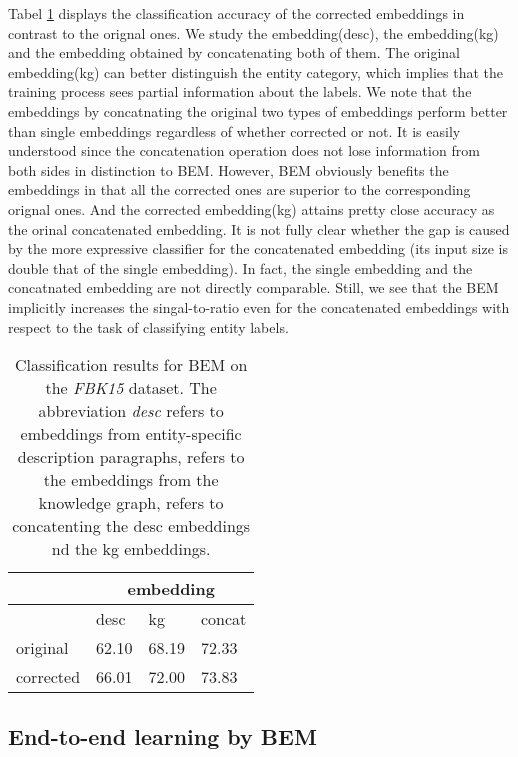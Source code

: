 Tabel \ref{tbl:entity_class_fbk15} displays the classification accuracy of the corrected embeddings in contrast to the orignal ones. We study the embedding(desc), the embedding(kg) and the embedding obtained by concatenating both of them. The original embedding(kg) can better distinguish the entity category, which implies that the training process sees partial information about the labels. We note that the embeddings by concatnating the original two types of embeddings perform better than single embeddings regardless of whether corrected or not. It is easily understood since the concatenation operation does not lose information from both sides in distinction to BEM. However, BEM obviously benefits the embeddings in that all the corrected ones are superior to the corresponding orignal ones. And the corrected embedding(kg) attains pretty close accuracy as the orinal concatenated embedding. It is not fully clear whether the gap is caused by the more expressive classifier for the concatenated embedding (its input size is double that of the single embedding). In fact, the single embedding and the concatnated embedding are not directly comparable. Still, we see that the BEM implicitly increases the singal-to-ratio even for the concatenated embeddings with respect to the task of classifying entity labels.

\begin{table}[h]
  \caption{Classification results for BEM on the \textit{FBK15} dataset. The abbreviation \textit{desc} refers to embeddings from entity-specific description paragraphs,  refers to the embeddings from the knowledge graph,  refers to concatenting the desc embeddings nd the kg embeddings.}
  \label{tbl:entity_class_fbk15}
  \centering
\begin{tabular}{l|l|l|l}
\hline
          & \multicolumn{3}{c}{embedding} \\ \hline
          & desc     & kg       & concat   \\ \hline
original  & 62.10    & 68.19    & 72.33    \\ 
corrected & 66.01    & 72.00    & 73.83    \\ \hline
\end{tabular}
\end{table}

\subsection{End-to-end learning by BEM}
 